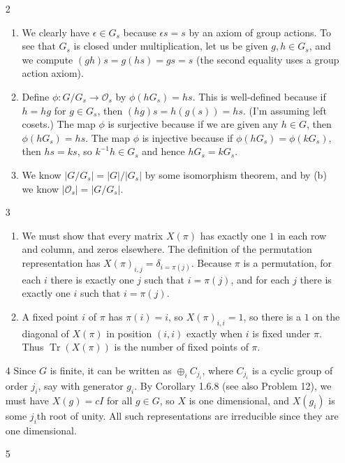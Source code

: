 \documentclass{amsart}
\DeclareMathOperator{\Tr}{Tr}
\begin{document}
\begin{enumerate}
\begin{enumerate}
    \end{enumerate}
    \item[2]
    \begin{enumerate}
        \item We clearly have $\epsilon \in G_s$ because $\epsilon s = s$ by an axiom of group actions.  To see that $G_s$ is closed under multiplication, let us be given $g,h \in G_s$, and we compute $(gh)s = g(hs) = gs = s$ (the second equality uses a group action axiom).
        \item Define $\phi : G/G_s \to \mathcal{O}_s$ by $\phi(hG_s) = hs$.  This is well-defined because if $h=hg$ for $g \in G_s$, then $(hg)s = h(g(s)) = hs$.  (I'm assuming left cosets.)  The map $\phi$ is surjective because if we are given any $h \in G$, then $\phi(hG_s) = hs$.  The map $\phi$ is injective because if $\phi(hG_s) = \phi(kG_s)$, then $hs = ks$, so $k^{-1}h \in G_s$ and hence $hG_s = kG_s$.
        \item We know $\left| G/G_s\right| = |G|/|G_s|$ by some isomorphism theorem, and by (b) we know $|\mathcal{O}_s| = \left| G/G_s\right|$.
    \end{enumerate}
    \item[3]
    \begin{enumerate}
        \item We must show that every matrix $X(\pi)$ has exactly one $1$
        in each row and column, and zeros elsewhere.  The definition of the permutation representation has $X(\pi)_{i,j} = \delta_{i=\pi(j)}$.
        Because $\pi$ is a permutation, for each $i$ there is exactly one $j$ such that $i=\pi(j)$, and for each $j$ there is exactly one $i$ such that $i=\pi(j)$.
        \item A fixed point $i$ of $\pi$ has $\pi(i) = i$, so $X(\pi)_{i,i}=1$, so there is a $1$ on the diagonal of $X(\pi)$
        in position $(i,i)$ exactly when $i$ is fixed under $\pi$.  Thus $\Tr(X(\pi))$ is the number of fixed points of $\pi$.
    \end{enumerate}
    \item[4] Since $G$ is finite, it can be written as $\oplus_i C_{j_i}$, where $C_{j_i}$ is a cyclic group of order $j_i$, say with generator $g_i$.  By Corollary 1.6.8 (see also Problem 12), we must have $X(g) = cI$ for all $g \in G$, so $X$ is one dimensional, and $X(g_i)$ is some $j_i$th root of unity.  All such representations are irreducible since they are one dimensional.
    \item[5]
    \begin{enumerate}

\end{enumerate}
\end{enumerate}
\end{document}
